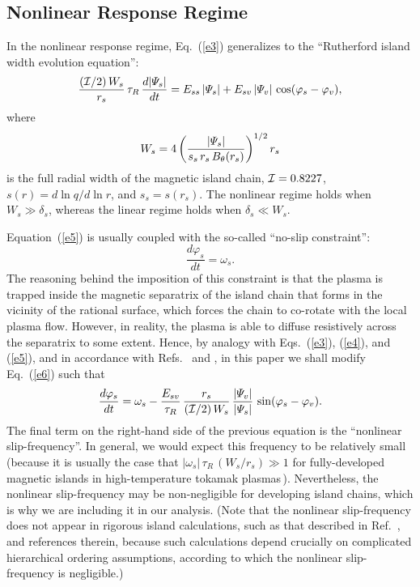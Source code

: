\documentclass[12pt,prb,aps]{revtex4-1}
\begin{document}
\subsection{Nonlinear Response Regime}
In the nonlinear response regime, Eq.~(\ref{e3}) generalizes to the ``Rutherford island width evolution equation'':\,\cite{ruth,ruth1}
\begin{equation}\label{e5}
\frac{({\cal I}/2)\,W_s}{r_s}\,\tau_R\,\frac{d|{\mit\Psi}_s|}{dt} = E_{ss}\,|{\mit\Psi}_s| + E_{sv}\,|{\mit\Psi}_v|\,\cos(\varphi_s-\varphi_v),
\end{equation}
where
\begin{equation}
W_s = 4\left(\frac{|{\mit\Psi}_s|}{s_s\,r_s\,B_\theta(r_s)}\right)^{1/2} r_s
\end{equation}
is the full radial width of the magnetic island chain, ${\cal I} = 0.8227$, $s(r) = d\ln q/d\ln r$, and $s_s=s(r_s)$. The
nonlinear regime holds when $W_s\gg \delta_s$, whereas the linear regime holds when $\delta_s\ll W_s$. 

Equation~(\ref{e5}) is usually coupled with the so-called ``no-slip constraint'':\,\cite{rfa}
\begin{equation}\label{e6}
\frac{d\varphi_s}{dt} = \omega_s.
\end{equation}
The reasoning behind the imposition of this constraint is that the plasma is trapped inside the
magnetic separatrix of the  island chain that forms in the vicinity of the rational surface,
which forces the chain to co-rotate with the local plasma flow. However, in reality, the plasma
is able to diffuse resistively across the separatrix to some extent. Hence, by analogy with Eqs.~(\ref{e3}), (\ref{e4}), and (\ref{e5}), and 
in accordance with Refs.~ and , in this paper we shall modify Eq.~(\ref{e6}) such that
\begin{equation}\label{e7}
\frac{d\varphi_s}{dt} = \omega_s - \frac{E_{sv}}{\tau_R}\,\frac{r_s}{({\cal I}/2)\,W_s}\,\frac{|{\mit\Psi}_v|}{|{\mit\Psi}_s|}\,\sin(\varphi_s-\varphi_v).
\end{equation}
The final term on the right-hand side of the previous equation is the ``nonlinear slip-frequency''. In general,
we would expect this frequency to be relatively small (because it is usually the case that $|\omega_s|\,\tau_R\,(W_s/r_s)\gg 1$
for fully-developed magnetic islands in high-temperature tokamak plasmas\,\cite{rf1,slip2}). Nevertheless, the
nonlinear slip-frequency may be non-negligible for developing island chains, which is why we are including it in our analysis.
(Note that the nonlinear slip-frequency does not appear in rigorous island calculations, such as
that described in Ref.~, and references therein, because such calculations depend crucially on
complicated hierarchical ordering assumptions, according to which the nonlinear slip-frequency is negligible.)
\end{document}
